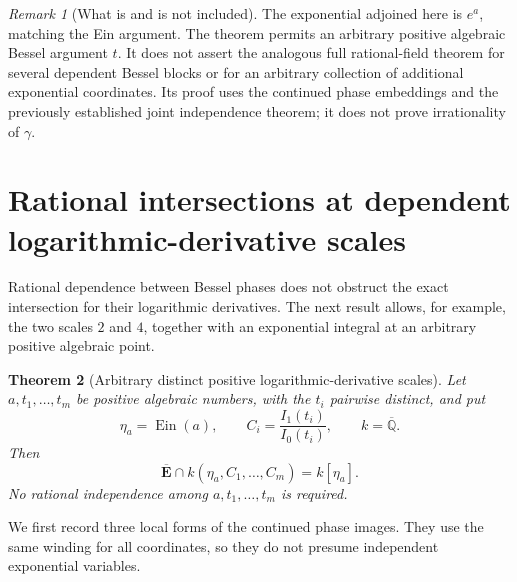\documentclass[11pt]{article}
\newtheorem{theorem}{Theorem}[section]
\theoremstyle{definition}
\theoremstyle{remark}
\newtheorem{remark}[theorem]{Remark}
\newcommand{\Ebar}{\overline{\mathbf E}}
\newcommand{\Ein}{\operatorname{Ein}}
\begin{document}
\begin{remark}[What is and is not included]
The exponential adjoined here is $e^a$, matching the Ein argument.
The theorem permits an arbitrary positive algebraic Bessel argument
$t$.  It does not assert the analogous full rational-field theorem
for several dependent Bessel blocks or for an arbitrary collection
of additional exponential coordinates.  Its proof uses the
continued phase embeddings and the previously established joint
independence theorem; it does not prove irrationality of $\gamma$.
\end{remark}

\section{Rational intersections at dependent logarithmic-derivative scales}
\label{dcr:section}

Rational dependence between Bessel phases does not obstruct the exact
intersection for their logarithmic derivatives. The next result allows,
for example, the two scales $2$ and $4$, together with an exponential
integral at an arbitrary positive algebraic point.

\begin{theorem}[Arbitrary distinct positive logarithmic-derivative scales]
\label{dcr:main}
Let $a,t_1,\ldots,t_m$ be positive algebraic numbers, with the $t_i$
pairwise distinct, and put
\[
 \eta_a=\Ein(a),\qquad C_i=\frac{I_1(t_i)}{I_0(t_i)},
 \qquad k=\overline{\mathbb Q}.
\]
Then
\begin{equation}\label{dcr:intersection}
 \boxed{\quad
 \Ebar\cap k(\eta_a,C_1,\ldots,C_m)=k[\eta_a].
 \quad}
\end{equation}
No rational independence among $a,t_1,\ldots,t_m$ is required.
\end{theorem}

We first record three local forms of the continued phase images. They
use the same winding for all coordinates, so they do not presume
independent exponential variables.
\end{document}
